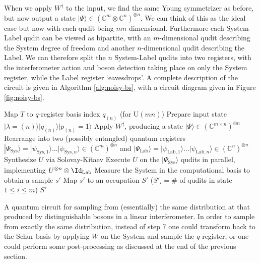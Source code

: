 When we apply $W^\dagger$ to the input, we find the same Young symmetrizer as before, but now output a state $|\Psi\rangle \in (\mathbb{C}^m\otimes\mathbb{C}^n)^{\otimes n}$. 
We can think of this as the ideal case but now with each qudit being $mn$ dimensional.
Furthermore each System-Label qudit can be viewed as bipartite, with an $m$-dimensional qudit describing the System degree of freedom and another $n$-dimensional qudit describing the Label. 
We can therefore split the $n$ System-Label qudits into two registers, with the interferometer action and boson detection taking place on only the System register, while the Label register `eavesdrops'.
A complete description of the circuit is given in Algorithm \ref{alg:noisy-bs}, with a circuit diagram given in Figure \ref{fig:noisy-bs}.
\begin{algorithm}
\BlankLine
Map $T$ to $q$-register basis index $q_{(n)}$ (for U$(mn)$)\;
Prepare input state $|\lambda=(n)\rangle|q_{(n)}\rangle|p_{(n)}=1\rangle$\;
Apply $W^\dagger$, producing a state $|\Psi\rangle \in (\mathbb{C}^{m \times n})^{\otimes n}$\;
Rearrange into two (possibly entangled) quantum registers $|\Psi_{\textrm{Sys}}\rangle = |\psi_{\textrm{Sys}, 1}\rangle\dots|\psi_{\textrm{Sys}, n}\rangle \in (\mathbb{C}^m)^{\otimes n}$ and $|\Psi_{\textrm{Lab}}\rangle = |\psi_{\textrm{Lab}, 1}\rangle\dots|\psi_{\textrm{Lab}, n}\rangle \in (\mathbb{C}^{n})^{\otimes n}$\;
Synthesize $U$ via Solovay-Kitaev\;
Execute $U$ on the $|\Psi_{\textrm{Sys}}\rangle$ qudits in parallel, implementing  $U^{\otimes n} \otimes \Id_\mathrm{Lab}$\;
Measure the System in the computational basis to obtain a sample $s'$\;
Map $s'$ to an occupation $S'$ ($S'_i = \#$ of qudits in state $1\leq i\leq m$)\;
\Return $S'$
\caption{A quantum circuit for sampling from (essentially) the same distribution at that produced by distinguishable bosons in a linear interferometer.
In order to sample from exactly the same distribution, instead of step 7 one could transform back to the Schur basis by applying $W$ on the System and sample the $q$-register, or one could perform some post-processing as discussed at the end of the previous section.}
\label{alg:noisy-bs}
\end{algorithm}

